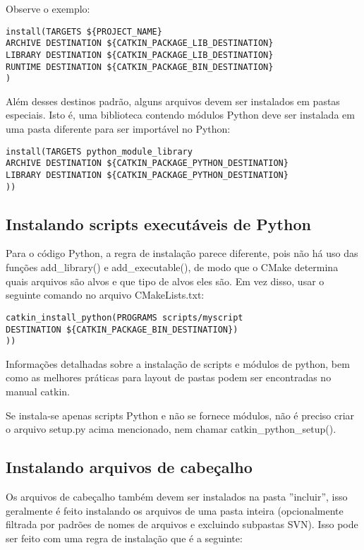 Observe o exemplo:

\begin{verbatim}
install(TARGETS ${PROJECT_NAME}
ARCHIVE DESTINATION ${CATKIN_PACKAGE_LIB_DESTINATION}
LIBRARY DESTINATION ${CATKIN_PACKAGE_LIB_DESTINATION}
RUNTIME DESTINATION ${CATKIN_PACKAGE_BIN_DESTINATION}
)\end{verbatim}



Além desses destinos padrão, alguns arquivos devem ser instalados em pastas especiais. Isto é, uma biblioteca contendo módulos Python deve ser instalada em uma pasta diferente para ser importável no Python:

\begin{verbatim}
install(TARGETS python_module_library
ARCHIVE DESTINATION ${CATKIN_PACKAGE_PYTHON_DESTINATION}
LIBRARY DESTINATION ${CATKIN_PACKAGE_PYTHON_DESTINATION}
))\end{verbatim}


\subsection{Instalando scripts executáveis de Python}

Para o código Python, a regra de instalação parece diferente, pois não há uso das funções add\_library() e add\_executable(), de modo que o CMake determina quais arquivos são alvos e que tipo de alvos eles são. Em vez disso, usar o seguinte comando no arquivo CMakeLists.txt:

\begin{verbatim}
catkin_install_python(PROGRAMS scripts/myscript
DESTINATION ${CATKIN_PACKAGE_BIN_DESTINATION})
))\end{verbatim}


Informações detalhadas sobre a instalação de scripts e módulos de python, bem como as melhores práticas para layout de pastas podem ser encontradas no manual catkin.

Se instala-se apenas scripts Python e não se fornece módulos, não é preciso criar o arquivo setup.py acima mencionado, nem chamar catkin\_python\_setup().

\subsection{Instalando arquivos de cabeçalho}

Os arquivos de cabeçalho também devem ser instalados na pasta ''incluir'', isso geralmente é feito instalando os arquivos de uma pasta inteira (opcionalmente filtrada por padrões de nomes de arquivos e excluindo subpastas SVN). Isso pode ser feito com uma regra de instalação que é a seguinte:

